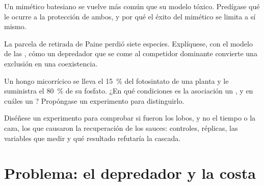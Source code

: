 \begin{exercise}[$\star\star$]\label{exo:b1:species-interactions:9}
Un mimético batesiano se vuelve más común que su modelo tóxico. Predígase
qué le ocurre a la protección de ambos, y por qué el éxito del mimético se
limita a sí mismo.
\end{exercise}

\begin{exercise}[$\star\star\star$]\label{exo:b1:species-interactions:10}
La parcela de retirada de Paine perdió siete especies. Explíquese, con el
modelo de las , cómo un depredador que se come al competidor
dominante convierte una exclusión en una coexistencia.
\end{exercise}

\begin{exercise}[$\star\star\star$]\label{exo:b1:species-interactions:11}
Un hongo micorrícico se lleva el \qty{15}{\%} del fotosintato de una planta
y le suministra el \qty{80}{\%} de su fosfato. ¿En qué condiciones es la
asociación un , y en cuáles un ? Propóngase un
experimento para distinguirlo.
\end{exercise}

\begin{exercise}[$\star\star\star$]\label{exo:b1:species-interactions:12}
Diséñese un experimento para comprobar si fueron los lobos, y no el tiempo o
la caza, los que causaron la recuperación de los sauces: controles,
réplicas, las variables que medir y qué resultado refutaría la cascada.
\end{exercise}

\section{Problema: el depredador y la costa}

